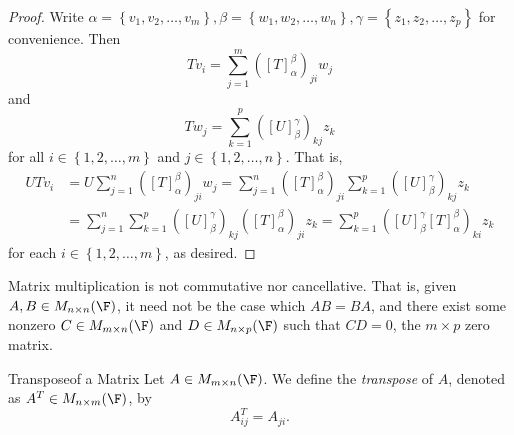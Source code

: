 \documentclass[linearalgebra]{subfiles}
\begin{document}
    \begin{proof}
        Write $\alpha=\left\lbrace v_1,v_2,\ldots,v_m \right\rbrace, \beta=\left\lbrace w_1,w_2,\ldots,w_n \right\rbrace, \gamma=\left\lbrace z_1,z_2,\ldots,z_p \right\rbrace$ for convenience. Then
        \begin{equation*}
            Tv_i = \sum^{m}_{j=1} \left( \left[ T \right] ^\beta_\alpha \right) _{ji}w_j
        \end{equation*}
        and
        \begin{equation*}
            Tw_j = \sum^{p}_{k=1} \left( \left[ U \right] ^\gamma_\beta \right) _{kj}z_k
        \end{equation*}
        for all $i\in\left\lbrace 1,2,\ldots,m \right\rbrace$ and $j\in\left\lbrace 1,2,\ldots,n \right\rbrace$. That is,
        \begin{align*}
            UTv_i & = U\sum^{n}_{j=1} \left( \left[ T \right] ^\beta_\alpha \right) _{ji}w_j = \sum^{n}_{j=1} \left( \left[ T \right] ^\beta_\alpha \right) _{ji} \sum^{p}_{k=1} \left( \left[ U \right] ^\gamma_\beta \right) _{kj} z_k \\ 
                  & = \sum^{n}_{j=1} \sum^{p}_{k=1} \left( \left[ U \right] ^\gamma_\beta \right) _{kj} \left( \left[ T \right] ^\beta_\alpha \right) _{ji} z_k = \sum^{p}_{k=1} \left( \left[ U \right] ^\gamma_\beta \left[ T \right] ^\beta_\alpha \right) _{ki}z_k
        \end{align*} 
        for each $i\in\left\lbrace 1,2,\ldots,m \right\rbrace$, as desired.
    \end{proof}

    \begin{remark}
        Matrix multiplication is not commutative nor cancellative. That is, given $A,B\in M_{n\times n}(\F)$, it need not be the case which $AB=BA$, and there exist some nonzero $C\in M_{m\times n}(\F)$ and $D\in M_{n\times p}(\F)$ such that $CD=0$, the $m\times p$ zero matrix.   
    \end{remark}

    \begin{definition}{Transpose}{of a Matrix}
        Let $A\in M_{m\times n}(\F)$. We define the \emph{transpose} of $A$, denoted as $A^{T}\in M_{n\times m}(\F)$, by
        \begin{equation*}
            A^{T} _{ij} = A_{ji}.
        \end{equation*}
    \end{definition}
\end{document}
